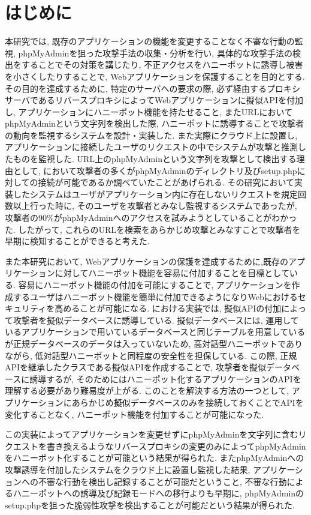 \documentclass[submit,techrep,noauthor]{ipsj}
\begin{document}
\section{はじめに}
本研究では, 既存のアプリケーションの機能を変更することなく不審な行動の監視, phpMyAdmin\cite{label6}を狙った攻撃手法の収集・分析を行い, 具体的な攻撃手法の検出をすることでその対策を講じたり, 不正アクセスをハニーポットに誘導し被害を小さくしたりすることで, Webアプリケーションを保護することを目的とする. その目的を達成するために, 特定のサーバへの要求の際, 必ず経由するプロキシサーバであるリバースプロキシ\cite{label4}によってWebアプリケーションに擬似APIを付加し, アプリケーションにハニーポット機能を持たせること, またURLにおいてphpMyAdminという文字列を検出した際, ハニーポットに誘導することで攻撃者の動向を監視するシステムを設計・実装した. また実際にクラウド上に設置し, アプリケーションに接続したユーザのリクエストの中でシステムが攻撃と推測したものを監視した.
URL上のphpMyAdminという文字列を攻撃として検出する理由として, \cite{label2}において攻撃者の多くがphpMyAdminのディレクトリ及びsetup.phpに対しての接続が可能であるか調べていたことがあげられる. その研究において実装したシステムはユーザがアプリケーション内に存在しないリクエストを規定回数以上行った時に, そのユーザを攻撃者とみなし監視するシステムであったが, 攻撃者の90\%がphpMyAdminへのアクセスを試みようとしていることがわかった. したがって, これらのURLを検索をあらかじめ攻撃とみなすことで攻撃者を早期に検知することができると考えた. \par
また本研究において, Webアプリケーションの保護を達成するために,既存のアプリケーションに対してハニーポット機能を容易に付加することを目標としている. 容易にハニーポット機能の付加を可能にすることで, アプリケーションを作成するユーザはハニーポット機能を簡単に付加できるようになりWebにおけるセキュリティを高めることが可能になる. \cite{label2}における実装では, 擬似APIの付加によって攻撃者を擬似データベースに誘導している.
擬似データベースには, 運用しているアプリケーションで用いているデータベースと同じテーブルを用意しているが正規データベースのデータは入っていないため, 高対話型ハニーポットでありながら, 低対話型ハニーポットと同程度の安全性を担保している. この際, 正規APIを継承したクラスである擬似APIを作成することで, 攻撃者を擬似データベースに誘導するが, そのためにはハニーポット化するアプリケーションのAPIを理解する必要があり難易度が上がる.
このことを解決する方法の一つとして, アプリケーションにあらかじめ擬似データベースのみを接続しておくことでAPIを変化することなく, ハニーポット機能を付加することが可能になった.\par
この実装によってアプリケーションを変更せずにphpMyAdminを文字列に含むリクエストを書き換えるようなリバースプロキシの変更のみによってphpMyAdminをハニーポット化することが可能という結果が得られた. またphpMyAdminへの攻撃誘導を付加したシステムをクラウド上に設置し監視した結果, アプリケーションへの不審な行動を検出し記録することが可能だということ, 不審な行動によるハニーポットへの誘導及び記録モードへの移行よりも早期に, phpMyAdminのsetup.phpを狙った脆弱性攻撃を検出することが可能だという結果が得られた.
\end{document}
